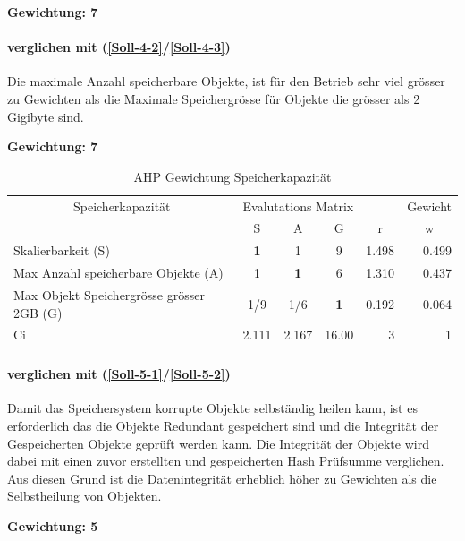 \textbf{Gewichtung: 7}

\paragraph*{ verglichen mit  (\ref{Soll-4-2}/\ref{Soll-4-3})}
Die maximale Anzahl speicherbare Objekte, ist für den Betrieb sehr viel grösser zu Gewichten als die Maximale Speichergrösse für Objekte die grösser als 2 Gigibyte sind.

\textbf{Gewichtung: 7}

\begin{table}[htbp]
\caption{AHP Gewichtung Speicherkapazität}
\begin{tabular}{|p{7.1cm}|c|c|c|r|r|}
\hline
\multicolumn{ 1}{|c|}{Speicherkapazität } & \multicolumn{ 3}{c|}{Evalutations Matrix} & \multicolumn{1}{l|}{} & \multicolumn{1}{l|}{Gewicht} \\ \cline{ 2- 6}
\multicolumn{ 1}{|c|}{} & S & A & G & \multicolumn{1}{c|}{r} & \multicolumn{1}{c|}{w} \\ \hline
Skalierbarkeit (S) & \textbf{1} & 1 & 9 & 1.498 & 0.499 \\ \hline
Max Anzahl speicherbare Objekte (A) & 1 & \textbf{1} & 6 & 1.310 & 0.437 \\ \hline
Max Objekt Speichergrösse grösser 2GB (G) &  1/9 &  1/6 & \textbf{1} & 0.192 & 0.064 \\ \hline \hline
Ci & \multicolumn{1}{r|}{2.111} & \multicolumn{1}{r|}{2.167} & \multicolumn{1}{r|}{16.00} & 3 & 1 \\ \hline
\end{tabular}
\label{AHPSpeicherkapazität}
\end{table}

\paragraph*{ verglichen mit  (\ref{Soll-5-1}/\ref{Soll-5-2})}
Damit das Speichersystem korrupte Objekte selbständig heilen kann, ist es erforderlich das die Objekte Redundant gespeichert sind und die Integrität der Gespeicherten Objekte geprüft werden kann. Die Integrität der Objekte wird dabei mit einen zuvor erstellten und gespeicherten Hash Prüfsumme verglichen. Aus diesen Grund ist die Datenintegrität erheblich höher zu Gewichten als die Selbstheilung von Objekten.

\textbf{Gewichtung: 5}

